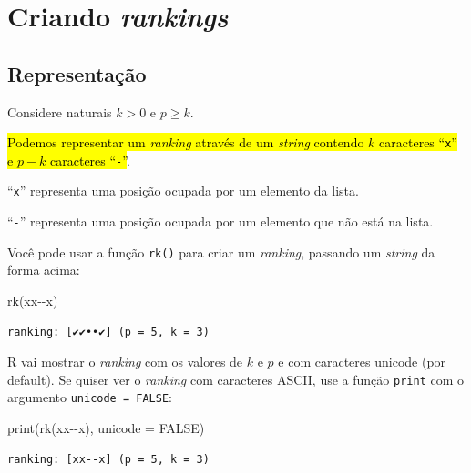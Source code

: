 \documentclass[
  letterpaper,
  DIV=11,
  numbers=noendperiod]{scrreprt}
\newenvironment{Shaded}{\begin{snugshade}}{\end{snugshade}}
\newcommand{\AttributeTok}[1]{\textcolor[rgb]{0.40,0.45,0.13}{#1}}
\newcommand{\ConstantTok}[1]{\textcolor[rgb]{0.56,0.35,0.01}{#1}}
\newcommand{\FunctionTok}[1]{\textcolor[rgb]{0.28,0.35,0.67}{#1}}
\newcommand{\NormalTok}[1]{\textcolor[rgb]{0.00,0.23,0.31}{#1}}
\newcommand{\StringTok}[1]{\textcolor[rgb]{0.13,0.47,0.30}{#1}}
\begin{document}
\section{\texorpdfstring{Criando
\emph{rankings}}{Criando rankings}}\label{criando-rankings}

\subsection{Representação}\label{sec-repr}

Considere naturais $k > 0$ e $p \geq k$.

{\hl{Podemos representar um \emph{ranking} através de um \emph{string}
contendo $k$ caracteres ``{\mbox{\texttt{x}}}'' e $p - k$ caracteres
``{\mbox{\texttt{-}}}''}}.

``\texttt{x}'' representa uma posição ocupada por um elemento da lista.

``\texttt{-}'' representa uma posição ocupada por um elemento que não
está na lista.

Você pode usar a função \texttt{rk()} para criar um \emph{ranking},
passando um \emph{string} da forma acima:

\begin{Shaded}
\begin{Highlighting}[]
\FunctionTok{rk}\NormalTok{(}\StringTok{\textquotesingle{}xx{-}{-}x\textquotesingle{}}\NormalTok{)}
\end{Highlighting}
\end{Shaded}

\begin{verbatim}
ranking: [✔✔••✔] (p = 5, k = 3)
\end{verbatim}

R vai mostrar o \emph{ranking} com os valores de $k$ e $p$ e com
caracteres unicode (por default). Se quiser ver o \emph{ranking} com
caracteres ASCII, use a função \texttt{print} com o argumento
\texttt{unicode\ =\ FALSE}:

\begin{Shaded}
\begin{Highlighting}[]
\FunctionTok{print}\NormalTok{(}\FunctionTok{rk}\NormalTok{(}\StringTok{\textquotesingle{}xx{-}{-}x\textquotesingle{}}\NormalTok{), }\AttributeTok{unicode =} \ConstantTok{FALSE}\NormalTok{)}
\end{Highlighting}
\end{Shaded}

\begin{verbatim}
ranking: [xx--x] (p = 5, k = 3)
\end{verbatim}
\end{document}
